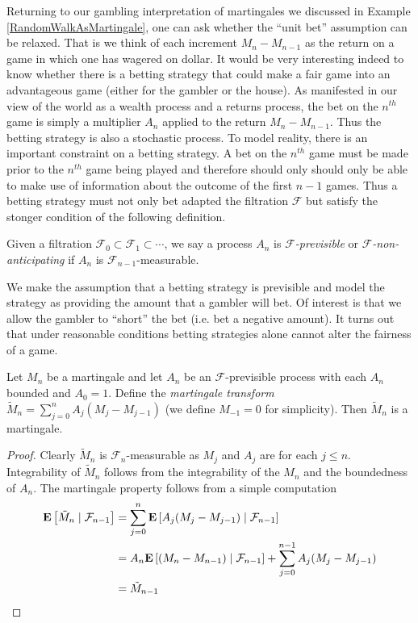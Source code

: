Returning to our gambling interpretation of martingales we discussed in Example
\ref{RandomWalkAsMartingale}, one can 
ask whether the ``unit bet'' assumption can be relaxed.  That is we
think of each increment $M_n - M_{n-1}$ as the return on a game in
which one has wagered on dollar.  It
would be very interesting indeed to know whether there is a betting
strategy that could make a fair game into an advantageous game (either
for the gambler or the house).  As manifested in our view of the world
as a wealth process and a returns process, the bet on the $n^{th}$
game is simply a multiplier $A_n$ applied to the return $M_n -
M_{n-1}$.  Thus the betting strategy is also a stochastic process.  To
model reality, there is an important
constraint on a betting strategy.  A bet on the $n^{th}$ game must be
made prior to the $n^{th}$ game being played and therefore should only
should only be able to make use of information about the outcome of
the first $n-1$ games.  Thus a betting strategy must not only bet
adapted the filtration $\mathcal{F}$ but satisfy the stonger condition
of the following definition.
\begin{defn}Given a filtration $\mathcal{F}_0 \subset \mathcal{F}_1
  \subset \cdots$, we say a process $A_n$ is \emph{$\mathcal{F}$-previsible} or
  \emph{$\mathcal{F}$-non-anticipating} if $A_n$ is $\mathcal{F}_{n-1}$-measurable.
\end{defn}
We make the assumption that a betting strategy is previsible and model
the strategy as providing the amount that a gambler will bet.  Of
interest is that we allow the gambler to ``short'' the bet (i.e. bet a
negative amount).  It turns out that under reasonable conditions
betting strategies alone cannot alter the fairness of a game.
\begin{lem}\label{DiscreteTimeMartingaleTransform}Let $M_n$ be a martingale and let $A_n$ be an
  $\mathcal{F}$-previsible process with each $A_n$ bounded and $A_0 =
  1$.  
Define the \emph{martingale transform}
  $\tilde{M}_n = \sum_{j=0}^n A_j\left(M_j - M_{j-1}\right )$ (we
  define $M_{-1} = 0$ for simplicity).  Then $\tilde{M}_n$ is a martingale.
\end{lem}
\begin{proof}
Clearly $\tilde{M}_n$ is $\mathcal{F}_n$-measurable as $M_j$ and
$A_j$ are for each $j\leq n$.  Integrability
of $\tilde{M}_n$ follows from the integrability of the $M_n$ and the
boundedness of $A_n$.  The martingale property follows from a simple
computation
\begin{align*}
\cexpectationlong{\mathcal{F}_{n-1}}{\tilde{M}_n} &= \sum_{j=0}^n
\cexpectationlong{\mathcal{F}_{n-1}}{A_j(M_j - M_{j-1})} \\
&=A_n \cexpectationlong{\mathcal{F}_{n-1}}{(M_n - M_{n-1})}  +
\sum_{j=0}^{n-1} A_j(M_j - M_{j-1})\\
&= \tilde{M}_{n-1}
\end{align*}
\end{proof}

